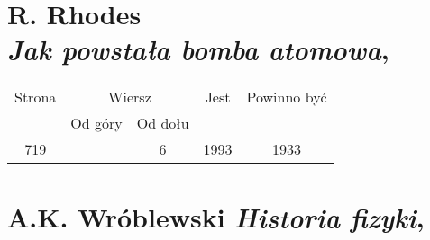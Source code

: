 \documentclass[a4paper,11pt]{article}
\numberwithin{equation}{section}
\begin{document}
\VerSpaceTwo

















\newpage

\section{ %
  R. Rhodes \\
  \textit{Jak powstała bomba atomowa}, \cite{Rhodes00}}

\label{sec:Rhodes-Jak-powstala-etc}




\begin{center}

  \begin{tabular}{|c|c|c|c|c|}
    \hline
    Strona & \multicolumn{2}{c|}{Wiersz} & Jest
                              & Powinno być \\ \cline{2-3}
    & Od góry & Od dołu & & \\
    \hline
    719 & &  6 & 1993 & 1933 \\
    \hline
  \end{tabular}

\end{center}

\VerSpaceTwo












\newpage

\section{A.K. Wróblewski \textit{Historia fizyki},
  \cite{Wroblewski06}}

\label{sec:Wroblewski-Historia-fizyki}
\end{document}

